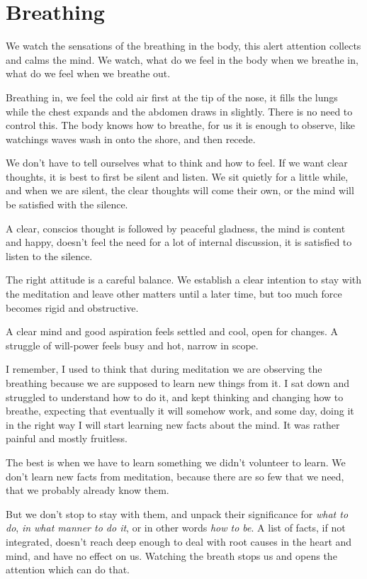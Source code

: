 \hypertarget{breathing-1}{%
\chapter{Breathing}\label{breathing-1}}

We watch the sensations of the breathing in the body, this alert
attention collects and calms the mind. We watch, what do we feel in the
body when we breathe in, what do we feel when we breathe out.

Breathing in, we feel the cold air first at the tip of the nose, it
fills the lungs while the chest expands and the abdomen draws in
slightly. There is no need to control this. The body knows how to
breathe, for us it is enough to observe, like watchings waves wash in
onto the shore, and then recede.

We don't have to tell ourselves what to think and how to feel. If we
want clear thoughts, it is best to first be silent and listen. We sit
quietly for a little while, and when we are silent, the clear thoughts
will come their own, or the mind will be satisfied with the silence.

A clear, conscios thought is followed by peaceful gladness, the mind is
content and happy, doesn't feel the need for a lot of internal
discussion, it is satisfied to listen to the silence.

The right attitude is a careful balance. We establish a clear intention
to stay with the meditation and leave other matters until a later time,
but too much force becomes rigid and obstructive.

A clear mind and good aspiration feels settled and cool, open for
changes. A struggle of will-power feels busy and hot, narrow in scope.

I remember, I used to think that during meditation we are observing the
breathing because we are supposed to learn new things from it. I sat
down and struggled to understand how to do it, and kept thinking and
changing how to breathe, expecting that eventually it will somehow work,
and some day, doing it in the right way I will start learning new facts
about the mind. It was rather painful and mostly fruitless.

The best is when we have to learn something we didn't volunteer to
learn. We don't learn new facts from meditation, because there are so
few that we need, that we probably already know them.

But we don't stop to stay with them, and unpack their significance for
\emph{what to do}, \emph{in what manner to do it}, or in other words
\emph{how to be}. A list of facts, if not integrated, doesn't reach deep
enough to deal with root causes in the heart and mind, and have no
effect on us. Watching the breath stops us and opens the attention which
can do that.

